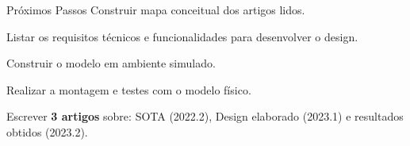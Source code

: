 


\begin{frame}[t]{Próximos Passos}
    \newcommand\vertspaceproximos{0.35cm}
    Construir mapa conceitual dos artigos lidos.
    \vspace*{\vertspaceproximos}

    Listar os requisitos técnicos e funcionalidades para desenvolver o design.
    \vspace*{\vertspaceproximos}

    Construir o modelo em ambiente simulado.
    \vspace*{\vertspaceproximos}

    Realizar a montagem e testes com o modelo físico.
    \vspace*{\vertspaceproximos}

    Escrever \textbf{3 artigos} sobre: SOTA (2022.2), Design elaborado (2023.1) e resultados obtidos (2023.2).
    \vspace*{\vertspaceproximos}
\end{frame}
